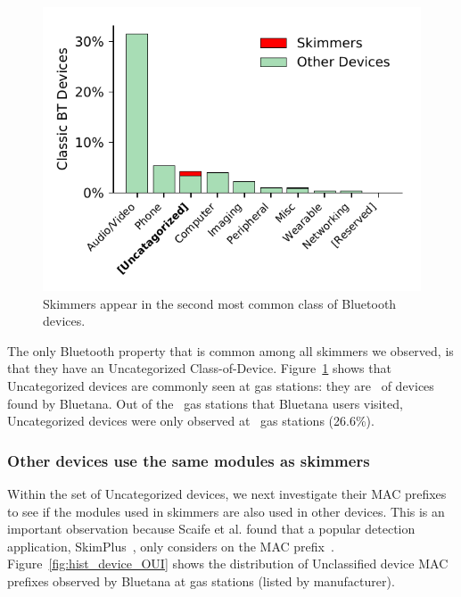 \begin{figure}
\centering
\includegraphics[width=\linewidth]{plots/hist_device_class.pdf}
\caption{
\label{fig:hist_device_class}
Skimmers appear in the second most common class of Bluetooth devices.
}
\end{figure}

The only Bluetooth property that is common among all skimmers we observed, is
that they have an Uncategorized Class-of-Device.
%
Figure~\ref{fig:hist_device_class} shows that
Uncategorized devices are commonly seen at gas stations: they are \percentbtuncategorized~of devices found by Bluetana.
%
Out of the \visitedgasstations~gas stations that Bluetana users visited, Uncategorized devices were only observed at
\totaluncatstation~gas stations (26.6\%).

\subsubsection*{Other devices use the same modules as skimmers} %


Within the set of Uncategorized devices, we next investigate their MAC prefixes
to see if the modules used in skimmers are also used in other devices.
%
%
%
This is an important observation because Scaife et al. found that a popular
detection application, SkimPlus~\cite{skimplus}, only considers on the MAC
prefix~\cite{scaifeoakland}.
%
Figure~\ref{fig:hist_device_OUI} shows the distribution of Unclassified device
MAC prefixes observed by Bluetana at gas stations (listed by manufacturer).

